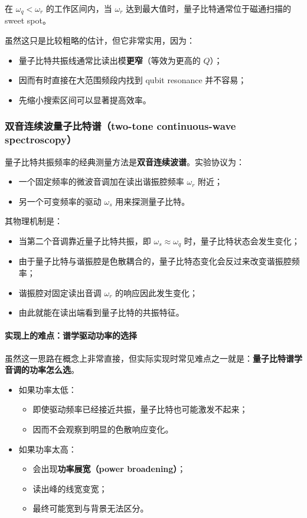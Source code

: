 \documentclass[12pt,a4paper,oneside]{ctexbook}
\begin{document}
在 \(\omega_q < \omega_r\) 的工作区间内，当 \(\omega_r\) 达到最大值时，量子比特通常位于磁通扫描的 sweet spot。

虽然这只是比较粗略的估计，但它非常实用，因为：
\begin{itemize}
    \item 量子比特共振线通常比读出模\textbf{更窄}（等效为更高的 \(Q\)）；
    \item 因而有时直接在大范围频段内找到 qubit resonance 并不容易；
    \item 先缩小搜索区间可以显著提高效率。
\end{itemize}

\subsubsection{双音连续波量子比特谱（two-tone continuous-wave spectroscopy）}

量子比特共振频率的经典测量方法是\textbf{双音连续波谱}。实验协议为：
\begin{itemize}
    \item 一个固定频率的微波音调加在读出谐振腔频率 \(\omega_r\) 附近；
    \item 另一个可变频率的驱动 \(\omega_s\) 用来探测量子比特。
\end{itemize}

其物理机制是：
\begin{itemize}
    \item 当第二个音调靠近量子比特共振，即 \(\omega_s \approx \omega_q\) 时，量子比特状态会发生变化；
    \item 由于量子比特与谐振腔是色散耦合的，量子比特态变化会反过来改变谐振腔频率；
    \item 谐振腔对固定读出音调 \(\omega_r\) 的响应因此发生变化；
    \item 由此就能在读出端看到量子比特的共振特征。
\end{itemize}

\paragraph{实现上的难点：谱学驱动功率的选择}
虽然这一思路在概念上非常直接，但实际实现时常见难点之一就是：\textbf{量子比特谱学音调的功率怎么选}。

\begin{itemize}
    \item 如果功率太低：
    \begin{itemize}
        \item 即使驱动频率已经接近共振，量子比特也可能激发不起来；
        \item 因而不会观察到明显的色散响应变化。
    \end{itemize}

    \item 如果功率太高：
    \begin{itemize}
        \item 会出现\textbf{功率展宽（power broadening）}；
        \item 读出峰的线宽变宽；
        \item 最终可能宽到与背景无法区分。
    \end{itemize}
\end{itemize}
\end{document}
